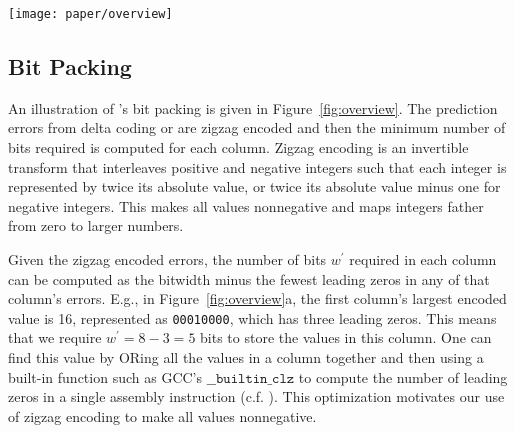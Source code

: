 \begin{figure*}[t]
\begin{center}
    \texttt{[image: paper/overview]}
    \caption{Overview of \minesp using a delta coding predictor.\textit{ a)} Delta coding of each column, followed by zigzag encoding of resulting errors. The maximum number of significant (nonzero) bits is computed for each column. \textit{b)} These numbers of bits are stored in a header, and the original data is stored as a (byte-aligned) payload, with leading zeros removed. When there are few columns, each column's data is stored contiguously. When there are many columns, each row is stored contiguously, possibly with padding to ensure alignment on a byte boundary.}
    \label{fig:overview}
    \vspace{-5mm}
\end{center}
\end{figure*}

\subsection{Bit Packing} \label{sec:bitpacking}

An illustration of \mine's bit packing is given in Figure~\ref{fig:overview}. The prediction errors from delta coding or \fire are zigzag encoded \cite{zigzag} and then the minimum number of bits required is computed for each column. Zigzag encoding is an invertible transform that interleaves positive and negative integers such that each integer is represented by twice its absolute value, or twice its absolute value minus one for negative integers. This makes all values nonnegative and maps integers father from zero to larger numbers.

Given the zigzag encoded errors, the number of bits $w^\prime$ required in each column can be computed as the bitwidth minus the fewest leading zeros in any of that column's errors. E.g., in Figure~\ref{fig:overview}a, the first column's largest encoded value is 16, represented as \texttt{00010000}, which has three leading zeros. This means that we require $w^\prime = 8 - 3 = 5$ bits to store the values in this column. One can find this value by ORing all the values in a column together and then using a built-in function such as GCC's $\texttt{\_\_builtin\_clz}$ to compute the number of leading zeros in a single assembly instruction (c.f. \cite{fastpfor}). This optimization motivates our use of zigzag encoding to make all values nonnegative.

